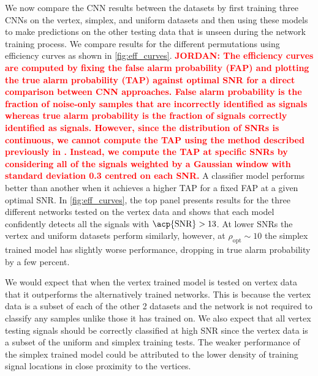 \documentclass[12pt]{iopart}
\newcommand{\jordan}[1]{\textbf{\textcolor{red}{JORDAN: #1}}}
\begin{document}
%
We now compare the \ac{CNN} results between the datasets by first training three \acp{CNN} on the vertex, simplex, and uniform datasets and then using these models to make predictions on the other testing data that is unseen during the network training process. We compare results for the different permutations using efficiency curves as shown in \cref{fig:eff_curves}.  \jordan{The efficiency curves are computed by fixing the false alarm probability (FAP) and plotting the true alarm probability (TAP) against optimal \ac{SNR} for a direct comparison between CNN approaches. False alarm probability is the fraction of noise-only samples that are incorrectly identified as signals whereas true alarm probability is the fraction of signals correctly identified as signals. However, since the distribution of \acp{SNR} is continuous, we cannot compute the TAP using the method described previously in \cite{Gabbard2017}. Instead, we compute the TAP at specific \acp{SNR} by considering all of the signals weighted by a Gaussian window with standard deviation 0.3 centred on each \ac{SNR}.} A classifier model performs better than another when it achieves a higher TAP for a fixed FAP at a given optimal SNR. In \cref{fig:eff_curves}, the top panel presents results for the three different networks tested on the vertex data and shows that each model confidently detects all the signals with $\text{\acp{SNR}} >13$. At lower \acp{SNR} the vertex and uniform datasets perform similarly, however, at $\rho_{\text{opt}}\sim 10$ the simplex trained model has slightly worse performance, dropping in true alarm probability by a few percent.

We would expect that when the vertex trained model is tested on vertex data that it outperforms the alternatively trained networks. This is because the vertex data is a subset of each of the other 2 datasets and the network is not required to classify any samples unlike those it has trained on. We also expect that all vertex testing signals should be correctly classified at high \ac{SNR} since the vertex data is a subset of the uniform and simplex training tests. The weaker performance of the simplex trained model could be attributed to the lower density of training signal locations in close proximity to the vertices.   
\end{document}
